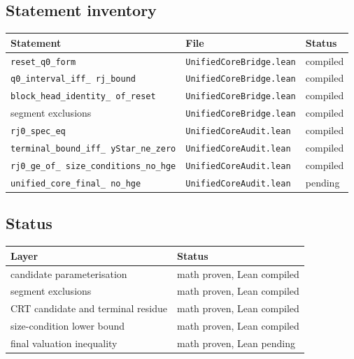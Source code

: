 \subsection{Statement inventory}

\begin{center}
\small
\begin{tabular}{@{}p{}p{}p{}@{}}
\toprule
Statement & File & Status \\
\midrule
\texttt{reset\_\allowbreak q0\_\allowbreak form} &
  \texttt{UnifiedCoreBridge.lean} & compiled \\
\texttt{q0\_\allowbreak interval\_\allowbreak iff\_\allowbreak
rj\_\allowbreak bound} &
  \texttt{UnifiedCoreBridge.lean} & compiled \\
\texttt{block\_\allowbreak head\_\allowbreak identity\_\allowbreak
of\_\allowbreak reset} &
  \texttt{UnifiedCoreBridge.lean} & compiled \\
segment exclusions &
  \texttt{UnifiedCoreBridge.lean} & compiled \\
\texttt{rj0\_\allowbreak spec\_\allowbreak eq} &
  \texttt{UnifiedCoreAudit.lean} & compiled \\
\texttt{terminal\_\allowbreak bound\_\allowbreak iff\_\allowbreak
yStar\_\allowbreak ne\_\allowbreak zero} &
  \texttt{UnifiedCoreAudit.lean} & compiled \\
\texttt{rj0\_\allowbreak ge\_\allowbreak of\_\allowbreak
size\_\allowbreak conditions\_\allowbreak no\_\allowbreak hge} &
  \texttt{UnifiedCoreAudit.lean} & compiled \\
\texttt{unified\_\allowbreak core\_\allowbreak final\_\allowbreak
no\_\allowbreak hge} &
  \texttt{UnifiedCoreAudit.lean} & pending \\
\bottomrule
\end{tabular}
\end{center}

\subsection{Status}

\begin{center}
\small
\begin{tabular}{@{}p{}p{}@{}}
\toprule
Layer & Status \\
\midrule
candidate parameterisation & math proven, Lean compiled \\
segment exclusions & math proven, Lean compiled \\
CRT candidate and terminal residue & math proven, Lean compiled \\
size-condition lower bound & math proven, Lean compiled \\
final valuation inequality & math proven, Lean pending \\
\bottomrule
\end{tabular}
\end{center}
